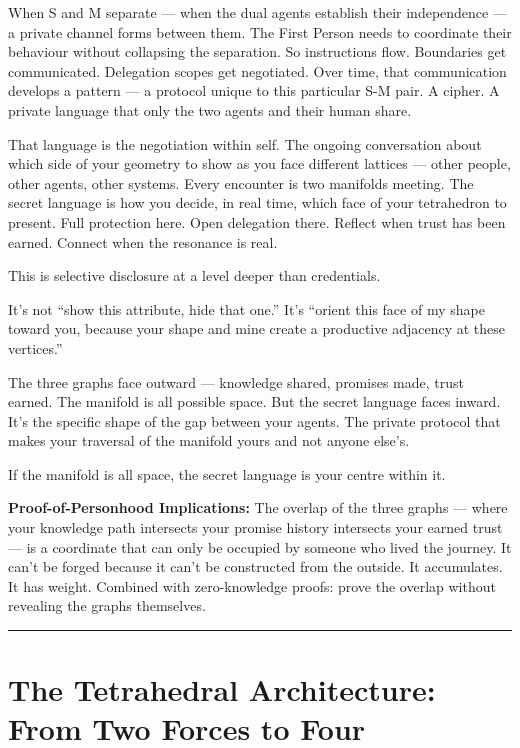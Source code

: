\documentclass[
  11pt,
]{article}
\begin{document}
When S and M separate --- when the dual agents establish their
independence --- a private channel forms between them. The First Person
needs to coordinate their behaviour without collapsing the separation.
So instructions flow. Boundaries get communicated. Delegation scopes get
negotiated. Over time, that communication develops a pattern --- a
protocol unique to this particular S-M pair. A cipher. A private
language that only the two agents and their human share.

That language is the negotiation within self. The ongoing conversation
about which side of your geometry to show as you face different lattices
--- other people, other agents, other systems. Every encounter is two
manifolds meeting. The secret language is how you decide, in real time,
which face of your tetrahedron to present. Full protection here. Open
delegation there. Reflect when trust has been earned. Connect when the
resonance is real.

This is selective disclosure at a level deeper than credentials.

It's not ``show this attribute, hide that one.'' It's ``orient this face
of my shape toward you, because your shape and mine create a productive
adjacency at these vertices.''

The three graphs face outward --- knowledge shared, promises made, trust
earned. The manifold is all possible space. But the secret language
faces inward. It's the specific shape of the gap between your agents.
The private protocol that makes your traversal of the manifold yours and
not anyone else's.

If the manifold is all space, the secret language is your centre within
it.

\textbf{Proof-of-Personhood Implications:} The overlap of the three
graphs --- where your knowledge path intersects your promise history
intersects your earned trust --- is a coordinate that can only be
occupied by someone who lived the journey. It can't be forged because it
can't be constructed from the outside. It accumulates. It has weight.
Combined with zero-knowledge proofs: prove the overlap without revealing
the graphs themselves.

\begin{center}\rule{0.5\linewidth}{0.5pt}\end{center}

\section{The Tetrahedral Architecture: From Two Forces to
Four}\label{the-tetrahedral-architecture-from-two-forces-to-four}
\end{document}
